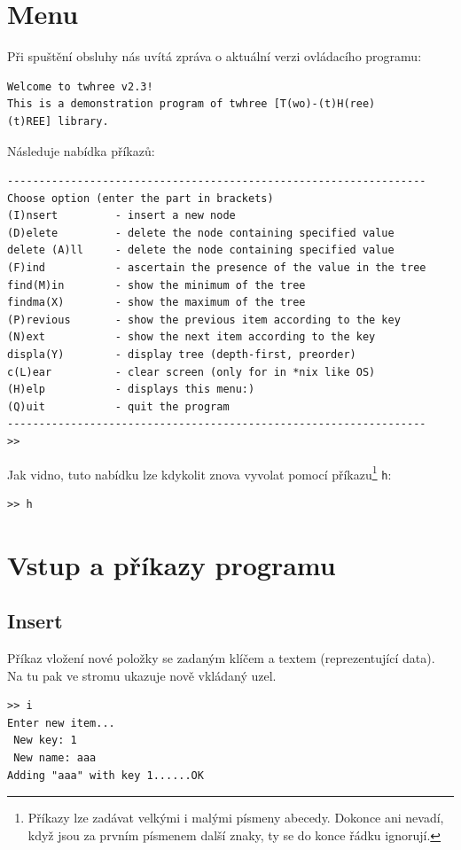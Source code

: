 \documentclass[11pt,a4paper]{article}
\begin{document}
\section{Menu}
Při spuštění obsluhy nás uvítá zpráva o aktuální verzi ovládacího programu:

\begin{verbatim}
Welcome to twhree v2.3!
This is a demonstration program of twhree [T(wo)-(t)H(ree)
(t)REE] library.
\end{verbatim}

Následuje nabídka příkazů:

\begin{verbatim}
------------------------------------------------------------------
Choose option (enter the part in brackets)
(I)nsert         - insert a new node 
(D)elete         - delete the node containing specified value 
delete (A)ll     - delete the node containing specified value 
(F)ind           - ascertain the presence of the value in the tree 
find(M)in        - show the minimum of the tree 
findma(X)        - show the maximum of the tree 
(P)revious       - show the previous item according to the key 
(N)ext           - show the next item according to the key 
displa(Y)        - display tree (depth-first, preorder) 
c(L)ear          - clear screen (only for in *nix like OS) 
(H)elp           - displays this menu:) 
(Q)uit           - quit the program 
------------------------------------------------------------------
>> 
\end{verbatim}

Jak vidno, tuto nabídku lze kdykolit znova vyvolat pomocí
příkazu\footnote{Příkazy lze zadávat velkými i malými písmeny abecedy.
Dokonce ani nevadí, když jsou za prvním písmenem další znaky, ty se do konce
řádku ignorují.} \verb=h=:

\begin{verbatim}
>> h 
\end{verbatim}

\section{Vstup a příkazy programu}
\subsection{Insert}
Příkaz vložení nové položky se zadaným klíčem a textem (reprezentující data).
Na tu pak ve stromu ukazuje nově vkládaný uzel.

\begin{verbatim}
>> i
Enter new item...
 New key: 1
 New name: aaa
Adding "aaa" with key 1......OK
\end{verbatim}
\end{document}
